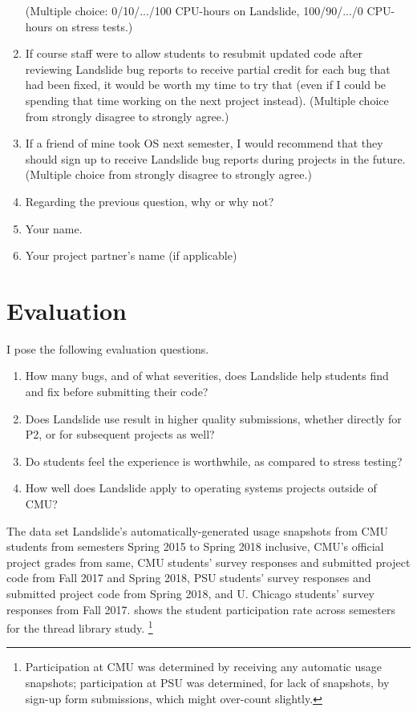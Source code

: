 \begin{enumerate}
		(Multiple choice: 0/10/.../100 CPU-hours on Landslide, 100/90/.../0 CPU-hours on stress tests.)
	\item If course staff were to allow students to resubmit updated code after reviewing Landslide bug reports to receive partial credit for each bug that had been fixed, it would be worth my time to try that (even if I could be spending that time working on the next project instead).
		(Multiple choice from strongly disagree to strongly agree.)
	\item If a friend of mine took OS next semester, I would recommend that they should sign up to receive Landslide bug reports during projects in the future.
		(Multiple choice from strongly disagree to strongly agree.)
	\item Regarding the previous question, why or why not?
	\item Your name.
	\item Your project partner's name (if applicable)
\end{enumerate}


\section{Evaluation}
\label{sec:education-eval}

I pose the following evaluation questions.

\vspace{0.5em}
\begin{enumerate}
	\item How many bugs, and of what severities, does Landslide help students find and fix before submitting their code?
	\item Does Landslide use result in higher quality submissions, whether directly for P2, or for subsequent projects as well?
	\item Do students feel the experience is worthwhile, as compared to stress testing?
	\item How well does Landslide apply to operating systems projects outside of CMU?
\end{enumerate}
\vspace{0.5em}

The data set  Landslide's automatically-generated usage snapshots
from CMU students from semesters Spring 2015 to Spring 2018 inclusive,
CMU's official project grades from same,
CMU students' survey responses and submitted project code from Fall 2017 and Spring 2018,
PSU students' survey responses and submitted project code from Spring 2018,
and U. Chicago students' survey responses from Fall 2017.
 shows the student participation rate across semesters
for the thread library study.%
\footnote{
Participation at CMU was determined by receiving any automatic usage snapshots;
participation at PSU was determined, for lack of snapshots, by sign-up form submissions, which might over-count slightly.
}

